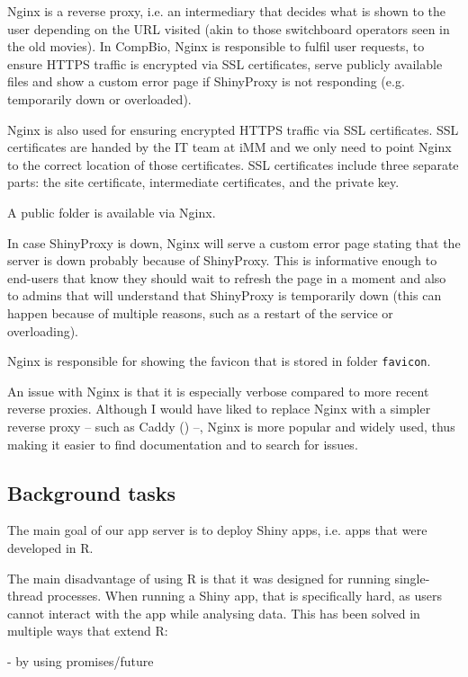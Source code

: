 Nginx is a reverse proxy, i.e. an intermediary that decides what is shown to the user depending on the URL visited (akin to those switchboard operators seen in the old movies). In CompBio, Nginx is responsible to fulfil user requests, to ensure HTTPS traffic is encrypted via SSL certificates, serve publicly available files and show a custom error page if ShinyProxy is not responding (e.g. temporarily down or overloaded).

Nginx is also used for ensuring encrypted HTTPS traffic via SSL certificates. SSL certificates are handed by the IT team at iMM and we only need to point Nginx to the correct location of those certificates. SSL certificates include three separate parts: the site certificate, intermediate certificates, and the private key.

A public folder is available via Nginx.

In case ShinyProxy is down, Nginx will serve a custom error page stating that the server is down probably because of ShinyProxy. This is informative enough to end-users that know they should wait to refresh the page in a moment and also to admins that will understand that ShinyProxy is temporarily down (this can happen because of multiple reasons, such as a restart of the service or overloading).

Nginx is responsible for showing the favicon that is stored in folder \texttt{favicon}.

An issue with Nginx is that it is especially verbose compared to more recent reverse proxies. Although I would have liked to replace Nginx with a simpler reverse proxy -- such as Caddy () --, Nginx is more popular and widely used, thus making it easier to find documentation and to search for issues.

\subsection{Background tasks}

The main goal of our app server is to deploy Shiny apps, i.e. apps that were developed in R.

The main disadvantage of using R is that it was designed for running single-thread processes. When running a Shiny app, that is specifically hard, as users cannot interact with the app while analysing data. This has been solved in multiple ways that extend R:

- by using promises/future

